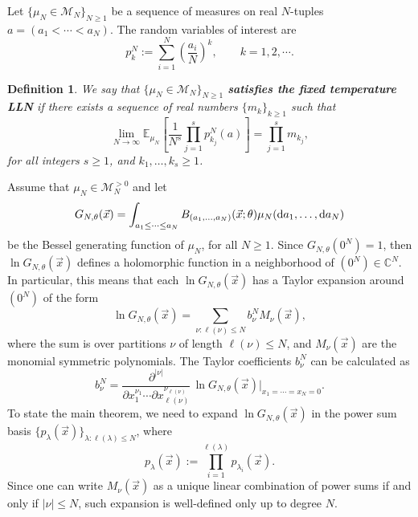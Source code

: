 \documentclass[11pt]{article}
\theoremstyle{plain}
\newtheorem{definition}[lemma]{Definition}
\newcommand{\C}{\mathbb C}
\newcommand{\setzeroes}{x_1=\cdots=x_N=0}
\newcommand{\la}{\lambda}
\newcommand{\M}{\mathcal M}
\renewcommand{\d}{\textrm d}
\newcommand{\vecx}{\vec{x}}
\begin{document}
Let $\{\mu_N\in\M_N\}_{N\ge 1}$ be a sequence of measures on real $N$-tuples $a=(a_1<\cdots<a_N)$.
The random variables of interest are
\[
p_k^N := \sum_{i=1}^N{\left(\frac{a_i}{N}\right)^k},\qquad k=1,2,\cdots.
\]

\begin{definition}\label{def:lln}
    We say that $\{\mu_N\in\M_N\}_{N\ge 1}$ \textbf{satisfies the fixed temperature LLN} if there exists a sequence of real numbers $\{m_k\}_{k\ge 1}$ such that
    \[
        \lim_{N\to\infty}{ \mathbb{E}_{\mu_N}\left[ \frac{1}{N^s}\prod_{j=1}^s{ p^N_{k_j}(a) } \right] } = \prod_{j=1}^s{m_{k_j}},
    \]
    for all integers $s\ge 1$, and $k_1,\dots,k_s\ge 1$.
\end{definition}

Assume that $\mu_N\in\M_N^{>0}$ and let
\[
G_{N,\theta}(\vecx) = \int_{a_1\le\cdots\le a_N}{B_{(a_1,\dots,a_N)}(\vecx;\theta)\mu_N(\d a_1,\dots,\d a_N)}
\]
be the Bessel generating function of $\mu_N$, for all $N\ge 1$.
Since $G_{N,\theta}(0^N)=1$, then $\ln{G_{N,\theta}(\vecx)}$ defines a holomorphic function in a neighborhood of $(0^N)\in\C^N$.
In particular, this means that each $\ln{G_{N,\theta}(\vecx)}$ has a Taylor expansion around $(0^N)$ of the form
\begin{equation}\label{eq:taylor_1}
\ln{G_{N,\theta}(\vecx)} = \sum_{\nu\colon\ell(\nu)\le N}{ b_\nu^N M_\nu(\vecx) },
\end{equation}
where the sum is over partitions $\nu$ of length $\ell(\nu)\le N$, and $M_\nu(\vecx)$ are the monomial symmetric polynomials.
The Taylor coefficients $b_\nu^N$ can be calculated as
\begin{equation}\label{eq:explicit_taylor}
    b_\nu^N = \frac{\partial^{|\nu|}}{\partial x_1^{\nu_1}\cdots \partial x_{\ell(\nu)}^{\nu_{\ell(\nu)}}}{\,\ln{G_{N,\theta}(\vecx)}}\bigg|_{\setzeroes}.
\end{equation}
To state the main theorem, we need to expand $\ln{G_{N,\theta}(\vecx)}$ in the power sum basis $\{p_\la(\vecx)\}_{\la\colon\ell(\la)\le N}$, where
\[
p_\la(\vecx):=\prod_{i=1}^{\ell(\la)}{p_{\la_i}(\vecx)}.
\]
Since one can write $M_{\nu}(\vecx)$ as a unique linear combination of power sums if  and only if $|\nu|\le N$, such expansion is well-defined only up to degree $N$.
\end{document}
